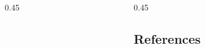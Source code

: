 \documentclass{beamer}
\begin{document}
\nocite{iosue2022page}

\begin{columns}[T]

    \begin{column}{0.45\textwidth}
        
    \end{column}
    
    \begin{column}{0.45\textwidth}
        
        
        \subsection{References}
        \printbibliography[heading=none]
    \end{column}

\end{columns}
\end{document}

